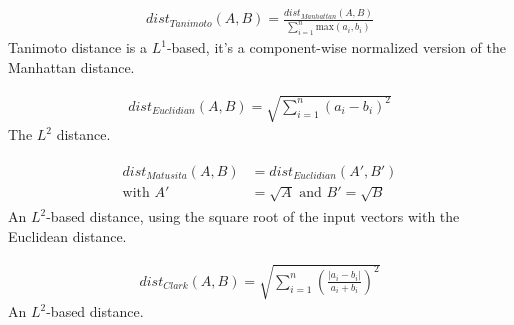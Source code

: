\begin{definition}
  \begin{gather*}
    dist_{Tanimoto}(A, B) = \frac{dist_{Manhattan}(A, B)}{\sum_{i=1}^{n} \mathrm{max}(a_i, b_i)}
  \end{gather*}
  Tanimoto distance is a $L^1$-based, it's a component-wise normalized version of the Manhattan distance.
\end{definition}

\begin{definition}
  \begin{gather*}
    dist_{Euclidian}(A, B) = \sqrt{\sum_{i=1}^{n}(a_i - b_i)^2}
  \end{gather*}
  The $L^2$ distance.
\end{definition}

\begin{definition}
  \begin{gather*}
    \begin{split}
      dist_{Matusita}(A, B) &= dist_{Euclidian}(A', B') \\
      \text{with }A' &= \sqrt{A}\text{ and }B' = \sqrt{B}
    \end{split}
  \end{gather*}
  An $L^2$-based distance, using the square root of the input vectors with the Euclidean distance.
\end{definition}

\begin{definition}
  \begin{gather*}
    dist_{Clark}(A, B) = \sqrt{\sum_{i=1}^{n}\left(\frac{|a_i - b_i|}{a_i + b_i}\right)^2}
  \end{gather*}
  An $L^2$-based distance.
\end{definition}

